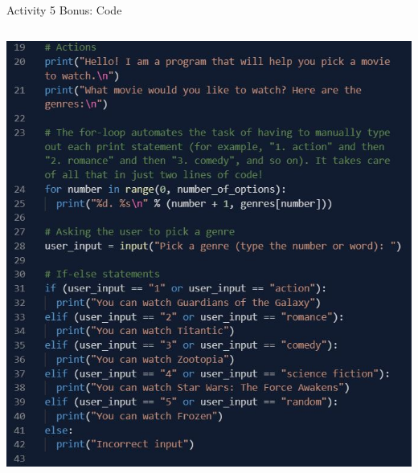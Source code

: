 \documentclass[hyperref={pdfpagemode=FullScreen},aspectratio=169]{beamer}
\begin{document}
\begin{frame}{Activity 5 Bonus: Code}
\begin{columns}[c]
      \begin{column}{0.45\textwidth}
        \begin{center}
          \includegraphics[scale=0.43]{./imgs/activityFiveAlternateCodePart2.jpg}
        \end{center}
      \end{column}
    \end{columns}
  \end{frame}
\end{document}
